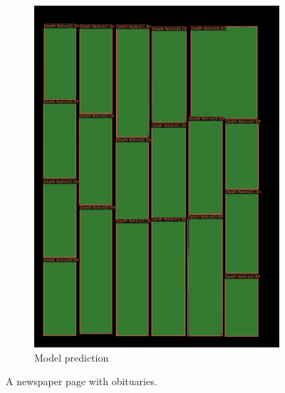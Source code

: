 \documentclass[aspectratio=1610]{beamer}
\begin{document}
\begin{frame}
\begin{figure}
\begin{subfigure}{.25\textwidth}
  \includegraphics[width=0.99\linewidth, clip=true, trim = 0mm 0mm 0mm 0mm]{figures/labels-vanilla-0.75/GQU6vjW.jpg}
  \caption{Model prediction}
\end{subfigure}
\caption{A newspaper page with obituaries.}
\label{fig:obituaries}
\end{figure}
\end{frame}
\normalpage
\end{document}
